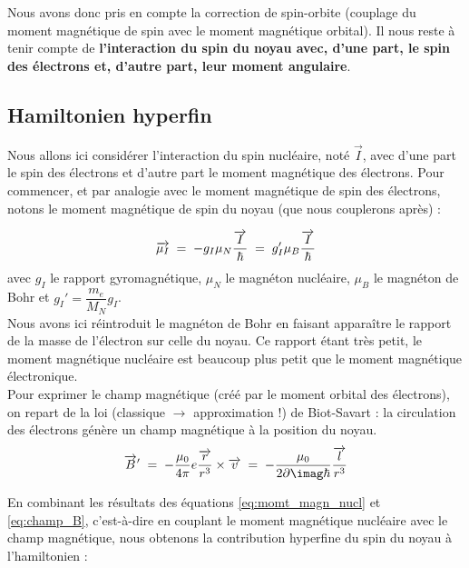 Nous avons donc pris en compte la correction de spin-orbite (couplage du moment magnétique de spin avec le moment magnétique orbital). Il nous reste à tenir compte de \textbf{l’interaction du spin du noyau avec, d'une part, le spin des électrons et, d'autre part, leur moment angulaire}.



    \subsection{Hamiltonien hyperfin}



Nous allons ici considérer l'interaction du spin nucléaire, noté $\overrightarrow{I}$, avec d'une part le spin des électrons et d'autre part le moment magnétique des électrons. Pour commencer, et par analogie avec le moment magnétique de spin des électrons, notons le moment magnétique de spin du noyau (que nous couplerons après) :

\begin{equation}
    \overrightarrow{\mu_I}
    \; = \; -g_I\mu_N\dfrac{\overrightarrow{I}}{\hbar}
    \; = \;  g_I'\mu_B\dfrac{\overrightarrow{I}}{\hbar}
    \label{eq:momt_magn_nucl}
\end{equation}
avec $g_I$ le rapport gyromagnétique, $\mu_N$ le magnéton nucléaire, $\mu_B$ le magnéton de Bohr et $g_I'=\dfrac{m_e}{M_N}g_I$.\\
Nous avons ici réintroduit le magnéton de Bohr en faisant apparaître le rapport de la masse de l’électron sur celle du noyau. Ce rapport étant très petit, le moment magnétique nucléaire est beaucoup plus petit que le moment magnétique électronique.\\

Pour exprimer le champ magnétique (créé par le moment orbital des électrons), on repart de la loi (classique $\rightarrow$ approximation !) de Biot-Savart : la circulation des électrons génère un champ magnétique à la position du noyau.
\begin{equation}
    \overrightarrow{B}' \eq
    -\dfrac{\mu_0}{4\pi}e\dfrac{\overrightarrow{r}}{r^3}\times \overrightarrow{v} \eq
    -\dfrac{\mu_0}{2\p\imag\hbar}\dfrac{\overrightarrow{l}}{r^3}
    \label{eq:champ_B}
\end{equation}

En combinant les résultats des équations \eqref{eq:momt_magn_nucl} et \eqref{eq:champ_B}, c'est-à-dire en couplant le moment magnétique nucléaire avec le champ magnétique, nous obtenons la contribution hyperfine du spin du noyau à l'hamiltonien :

